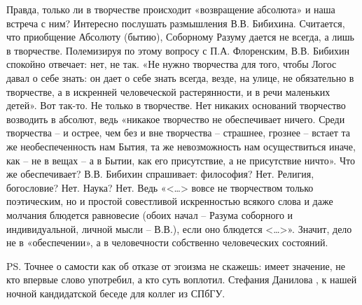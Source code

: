 Правда, только ли в творчестве происходит «возвращение абсолюта» и наша встреча
с ним? Интересно послушать размышления В.В. Бибихина. Считается, что приобщение
Абсолюту (бытию), Соборному Разуму дается не всегда, а лишь в творчестве.
Полемизируя по этому вопросу с П.А. Флоренским, В.В. Бибихин  спокойно
отвечает: нет, не так. «Не нужно творчества для того, чтобы Логос давал о себе
знать: он дает о себе знать всегда, везде, на улице, не обязательно в
творчестве, а в искренней человеческой растерянности, и в речи маленьких
детей». Вот так-то. Не только в творчестве. Нет никаких оснований творчество
возводить в абсолют, ведь «никакое творчество не обеспечивает ничего. Среди
творчества – и острее, чем без и вне творчества – страшнее, грознее – встает та
же необеспеченность нам Бытия, та же невозможность нам осуществиться иначе, как
– не в вещах – а в Бытии, как его присутствие, а не присутствие ничто». Что же
обеспечивает? В.В. Бибихин спрашивает: философия? Нет. Религия, богословие?
Нет. Наука? Нет. Ведь «<…> вовсе не творчеством только поэтическим, но и
простой совестливой искренностью всякого слова и даже молчания блюдется
равновесие (обоих начал – Разума соборного и индивидуальной, личной мысли –
В.В.), если оно блюдется <…>». Значит, дело не в «обеспечении», а в
человечности собственно человеческих состояний. 

PS. Точнее о самости как об отказе от эгоизма не скажешь: имеет значение, не кто впервые слово употребил, а кто суть воплотил. Стефания Данилова
 , к нашей ночной кандидатской беседе для коллег из СПбГУ.
